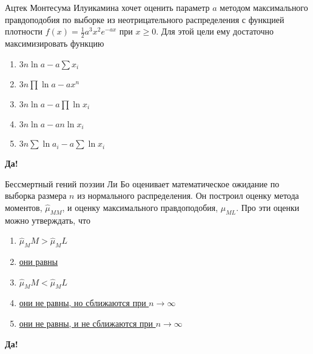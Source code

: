 \documentclass[t]{beamer}
\begin{document}
 \begin{frame} \label{52-Yes} 
\begin{block}{52} 

Ацтек Монтесума Илуикамина хочет оценить параметр $a$ методом максимального правдоподобия по выборке из неотрицательного распределения с функцией плотности $f(x)=\frac{1}{2}a^3x^2e^{-ax}$ при $x\geq 0$. Для этой цели ему достаточно максимизировать функцию
 


 \end{block} 
\begin{enumerate} 
\item[] \hyperlink{52-Yes}{\beamergotobutton{} $3n \ln a - a \sum x_i$}
\item[] \hyperlink{52-No}{\beamergotobutton{} $3n\prod \ln a - a x^n$}
\item[] \hyperlink{52-No}{\beamergotobutton{} $3n\ln a - a \prod \ln x_i$}
\item[] \hyperlink{52-No}{\beamergotobutton{} $3n \ln a - an \ln x_i$}
\item[] \hyperlink{52-No}{\beamergotobutton{} $3n \sum \ln a_i - a \sum \ln x_i$}
\end{enumerate} 

 \textbf{Да!} 
 \hyperlink{53}{}\end{frame} 


 \begin{frame} \label{53-Yes} 
\begin{block}{53} 

Бессмертный гений поэзии Ли Бо оценивает математическое ожидание  по выборка размера $n$ из нормального распределения. Он построил оценку метода моментов, $\hat{\mu}_{MM}$, и оценку максимального правдоподобия, $\hat{\mu}_{ML}$. Про эти оценки можно утверждать, что
 


 \end{block} 
\begin{enumerate} 
\item[] \hyperlink{53-No}{\beamergotobutton{}  $\hat\mu_MM>\hat\mu_ML$}
\item[] \hyperlink{53-Yes}{\beamergotobutton{} они равны}
\item[] \hyperlink{53-No}{\beamergotobutton{} $\hat\mu_MM<\hat\mu_ML$ }
\item[] \hyperlink{53-No}{\beamergotobutton{} они не равны, но сближаются при $n\to \infty$}
\item[] \hyperlink{53-No}{\beamergotobutton{} они не равны, и не сближаются при $n\to \infty$}
\end{enumerate} 

 \textbf{Да!} 
 \hyperlink{54}{}\end{frame} 
\end{document}
